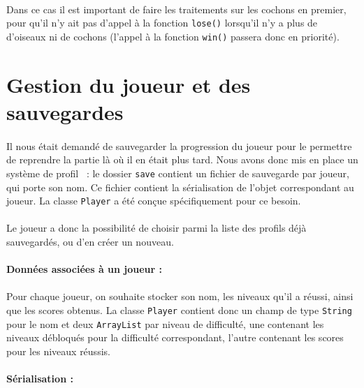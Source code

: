 \documentclass[a4paper,12pt]{report}
\begin{document}
\paragraph{}Dans ce cas il est important de faire les traitements sur les cochons en premier, pour qu'il n'y ait pas d'appel à la fonction \verb+lose()+ lorsqu'il n'y a plus de d'oiseaux ni de cochons (l'appel à la fonction \verb+win()+ passera donc en priorité).

\section{Gestion du joueur et des sauvegardes}
\paragraph{}Il nous était demandé de sauvegarder la progression du joueur pour le permettre de reprendre la partie là où il en était plus tard. Nous avons donc mis en place un système de \guillemotleft profil\guillemotright~ : le dossier \verb+save+ contient un fichier de sauvegarde par joueur, qui porte son nom. Ce fichier contient la sérialisation de l'objet correspondant au joueur. La classe \verb+Player+ a été conçue spécifiquement pour ce besoin.

\paragraph{}Le joueur a donc la possibilité de choisir parmi la liste des profils déjà sauvegardés, ou d'en créer un nouveau.

\paragraph{Données associées à un joueur :}
\paragraph{}Pour chaque joueur, on souhaite stocker son nom, les niveaux qu'il a réussi, ainsi que les scores obtenus. La classe \verb+Player+ contient donc un champ de type \verb+String+ pour le nom et deux \verb+ArrayList+ par niveau de difficulté, une contenant les niveaux débloqués pour la difficulté correspondant, l'autre contenant les scores pour les niveaux réussis.

\paragraph{Sérialisation :}
\end{document}
